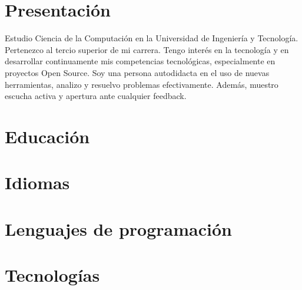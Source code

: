 \documentclass[10pt, a4paper]{moderncv}
\begin{document}
\maketitle
\section{Presentación}
Estudio Ciencia de la Computación en la Universidad de Ingeniería y Tecnología.
Pertenezco al tercio superior de mi carrera.
Tengo interés en la tecnología y en desarrollar continuamente mis competencias tecnológicas, especialmente en proyectos Open Source.
Soy una persona autodidacta en el uso de nuevas herramientas, analizo y resuelvo problemas efectivamente.
Además, muestro escucha activa y apertura ante cualquier feedback.

\section{Educación}

\section{Idiomas}


\section{Lenguajes de programación}

\section{Tecnologías}
\end{document}
